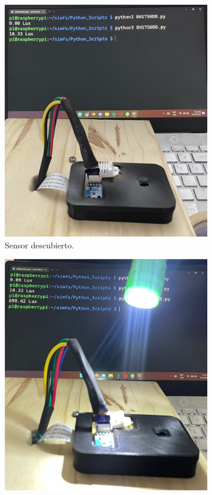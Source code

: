 \begin{figure}[H]
\begin{subfigure}{0.33\textwidth}
        \includegraphics[width=\linewidth]{ImagenesValidacion del prototipo/TINTFUN3b}
        \caption{Sensor descubierto.}
	\end{subfigure}\hfill
    \begin{subfigure}{0.33\textwidth}
    	\centering \vspace*{3.5mm}
        \includegraphics[width=\linewidth]{ImagenesValidacion del prototipo/TINTFUN3c}

\end{subfigure}
\end{figure}

